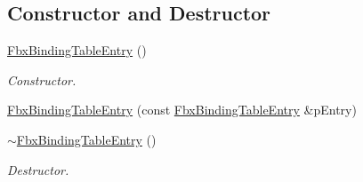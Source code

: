 \subsection*{Constructor and Destructor}
\begin{DoxyCompactItemize}
\item 
\hyperlink{class_fbx_binding_table_entry_adb98df78de880e1573a752f39b757106}{Fbx\+Binding\+Table\+Entry} ()
\begin{DoxyCompactList}\small\item\em Constructor. \end{DoxyCompactList}\item 
\hyperlink{class_fbx_binding_table_entry_a8abd468d6785e4d7111e4497daedf341}{Fbx\+Binding\+Table\+Entry} (const \hyperlink{class_fbx_binding_table_entry}{Fbx\+Binding\+Table\+Entry} \&p\+Entry)
\item 
\hyperlink{class_fbx_binding_table_entry_aefa8ba4b1276024d35fa49521e471d81}{$\sim$\+Fbx\+Binding\+Table\+Entry} ()
\begin{DoxyCompactList}\small\item\em Destructor. \end{DoxyCompactList}\end{DoxyCompactItemize}
